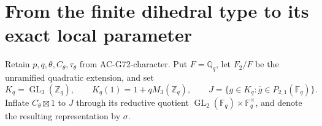 \section{From the finite dihedral type to its exact local parameter}
\label{sec:cubic-finite-type-local}

Retain $p,q,\theta,C_\theta,\tau_\theta$ from
AC-G72-character.  Put $F=\mathbb Q_q$, let $F_2/F$ be the
unramified quadratic extension, and set
\[
 K_q=\operatorname{GL}_3(\mathbb Z_q),\qquad
 K_q(1)=1+qM_3(\mathbb Z_q),\qquad
 J=\{g\in K_q:\overline g\in P_{2,1}(\mathbb F_q)\}.
                                                        \tag{G72L.1}
\]
Inflate $C_\theta\boxtimes1$ to $J$ through its reductive
quotient $\operatorname{GL}_2(\mathbb F_q)\times\mathbb F_q^\times$,
and denote the resulting representation by $\sigma$.

